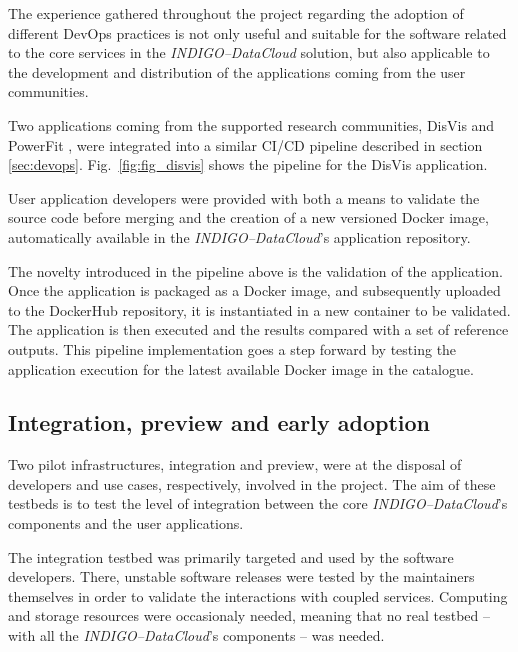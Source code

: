 The experience gathered throughout the project regarding the adoption of
different DevOps practices is not only useful and suitable for the software related
to the core services in the {\sl INDIGO--DataCloud} solution, but also applicable to the
development and distribution of the applications coming from the user communities.

Two applications coming from the supported research communities,
DisVis \cite{disvis} and PowerFit \cite{powerfit}, were
integrated into a similar CI/CD pipeline described in section \ref{sec:devops}.
Fig.~\ref{fig:fig_disvis} shows the pipeline for the DisVis application.

User application developers were provided with both a means to validate the
source code before merging and the creation of a new versioned Docker image,
automatically available in the {\sl INDIGO--DataCloud}'s application repository.

The novelty introduced in the pipeline above is the validation of the application.
Once the application is packaged as a Docker image, and subsequently uploaded
to the DockerHub repository, it is instantiated in a new container to be validated.
The application is then executed and the results compared with a set of reference outputs.
This pipeline implementation goes a step forward by testing the application
execution for the latest available Docker image in the catalogue.

\subsection{Integration, preview and early adoption}

Two pilot infrastructures, integration and preview, were at the disposal of developers and use cases, 
respectively, involved in the project. The aim of these testbeds is to test the level of integration 
between the core {\sl INDIGO--DataCloud}'s components and the user applications.

The integration testbed was primarily targeted and used by the software developers. 
There, unstable
software releases were tested by the maintainers themselves in order to validate the interactions
with coupled services. Computing and storage resources were occasionaly needed, meaning that no real
testbed -- with all
the {\sl INDIGO--DataCloud}'s components -- was needed. 

